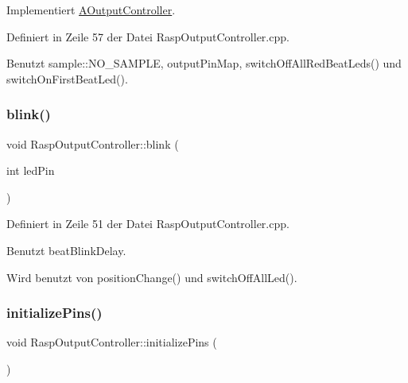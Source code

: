 Implementiert \hyperlink{class_a_output_controller_ac2b87aa6291c38cc65185bf6a37ae300}{A\+Output\+Controller}.



Definiert in Zeile 57 der Datei Rasp\+Output\+Controller.\+cpp.



Benutzt sample\+::\+N\+O\+\_\+\+S\+A\+M\+P\+LE, output\+Pin\+Map, switch\+Off\+All\+Red\+Beat\+Leds() und switch\+On\+First\+Beat\+Led().

\mbox{\label{class_rasp_output_controller_a27fcbf9e1a1f9c3cefefefd537acc401}} 
\subsubsection{\texorpdfstring{blink()}{blink()}}
{\footnotesize\ttfamily void Rasp\+Output\+Controller\+::blink (\begin{DoxyParamCaption}\item[{int}]{led\+Pin }\end{DoxyParamCaption})}



Definiert in Zeile 51 der Datei Rasp\+Output\+Controller.\+cpp.



Benutzt beat\+Blink\+Delay.



Wird benutzt von position\+Change() und switch\+Off\+All\+Led().

\mbox{\label{class_rasp_output_controller_a1172c2966777bbcee89cbe4e6de027d5}} 
\subsubsection{\texorpdfstring{initialize\+Pins()}{initializePins()}}
{\footnotesize\ttfamily void Rasp\+Output\+Controller\+::initialize\+Pins (\begin{DoxyParamCaption}{ }\end{DoxyParamCaption})\hspace{0.3cm}{\ttfamily [private]}}



